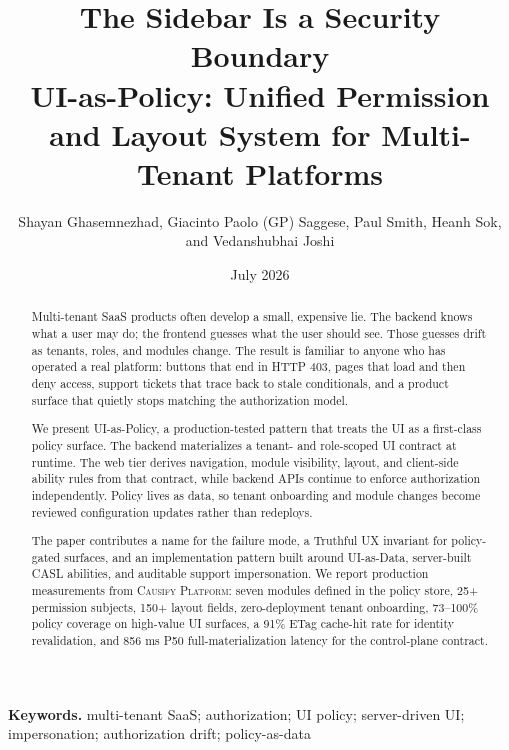 \documentclass[11pt, reqno]{amsart}
\title[UI-as-Policy]{The Sidebar Is a Security Boundary\\
\large UI-as-Policy: Unified Permission and Layout System for Multi-Tenant Platforms}
\author[Ghasemnezhad et al.]{Shayan Ghasemnezhad, Giacinto Paolo (GP) Saggese, Paul Smith, Heanh Sok, and Vedanshubhai Joshi}
\date{July 2026}
\newcommand{\system}{\textsc{Causify Platform}}
\newcommand{\uiData}{UI-as-Data}
\newcommand{\uiPolicy}{UI-as-Policy}
\newcommand{\code}[1]{\texttt{\detokenize{#1}}}
\begin{document}
\begin{abstract}
Multi-tenant SaaS products often develop a small, expensive lie. The backend knows what a user may do; the frontend guesses what the user should see. Those guesses drift as tenants, roles, and modules change. The result is familiar to anyone who has operated a real platform: buttons that end in HTTP 403, pages that load and then deny access, support tickets that trace back to stale conditionals, and a product surface that quietly stops matching the authorization model.

We present \uiPolicy{}, a production-tested pattern that treats the UI as a first-class policy surface. The backend materializes a tenant- and role-scoped UI contract at runtime. The web tier derives navigation, module visibility, layout, and client-side ability rules from that contract, while backend APIs continue to enforce authorization independently. Policy lives as data, so tenant onboarding and module changes become reviewed configuration updates rather than redeploys.

The paper contributes a name for the failure mode, a Truthful UX invariant for policy-gated surfaces, and an implementation pattern built around \uiData{}, server-built CASL abilities, and auditable support impersonation. We report production measurements from \system{}: seven modules defined in the policy store, 25+ permission subjects, 150+ layout fields, zero-deployment tenant onboarding, 73--100\% policy coverage on high-value UI surfaces, a 91\% ETag cache-hit rate for identity revalidation, and 856 ms P50 full-materialization latency for the \code{/v2/me} control-plane contract.
\end{abstract}

\maketitle
{}

\noindent\textbf{Keywords.} multi-tenant SaaS; authorization; UI policy; server-driven UI; impersonation; authorization drift; policy-as-data

\setcounter{tocdepth}{1}
\tableofcontents












\end{document}
